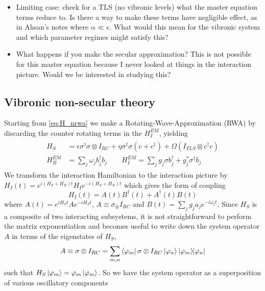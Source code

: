 \documentclass[]{article}
\begin{document}
\begin{itemize}
	\item Limiting case: check for a TLS (no vibronic levels) what the master equation terms reduce to. Is there a way to make these terms have negligible effect, as in Ahsan's notes where $\alpha\ll \epsilon$. What would this mean for the vibronic system and which parameter regimes might satisfy this?
	\item What happens if you make the secular approximation? This is not possible for this master equation because I never looked at things in the interaction picture. Would we be interested in studying this?
\end{itemize}
\subsection{Vibronic non-secular theory}
\label{ssec:nsec}
Starting from \ref{eq:H_nrwa} we make a Rotating-Wave-Approximation (RWA) by discarding the counter rotating terms in the $H^{EM}_I$, yielding
\begin{align}
	\begin{split}
		H_S &= \epsilon \sigma^{\dagger}\sigma\otimes I_{RC} + \eta\sigma^{\dagger}\sigma(c + c^{\dagger}) + \Omega ( I_{TLS}\otimes c^{\dagger}c) \\
		H_B^{EM} &= \sum_{j}\omega_j b^{\dagger}_j b_j \quad \quad H_I^{EM} = \sum_{j}g_j\sigma b^{\dagger}_j+ g_j^*\sigma^{\dagger} b_j 
	\end{split}
\end{align}
We transform the interaction Hamiltonian to the interaction picture by $H_I(t) = e^{i(H_S+H_B) t}H_I e^{-i (H_S+H_B)t}$ which gives the form of coupling
\begin{equation}
\label{eq:IDecomposition}
H_I(t) = A(t) B^{\dagger}(t) + A^{\dagger}(t) B(t)  
\end{equation}
where $A(t) = e^{iH_S t}Ae^{-i H_S t}$, $A \equiv\sigma_\otimes I_{RC}$ and $B(t)= \sum_{j}g_ja_je^{-i\omega_j t}$. Since $H_S$ is a composite of two interacting subsystems, it is not straightforward to perform the matrix exponentiation and becomes useful to write down the system operator $A$ in terms of the eigenstates of $H_S$,
\begin{equation}
A \equiv \sigma\otimes I_{RC} = \sum_{m,n} \bra{\varphi_m}\sigma\otimes I_{RC}\ket{\varphi_n}\dyad{\varphi_m}{\varphi_n}
\end{equation}
such that $H_S\ket{\varphi_m}=\varphi_m\ket{\varphi_m}$. So we have the system operator as a superposition of various oscillatory components
\end{document}
